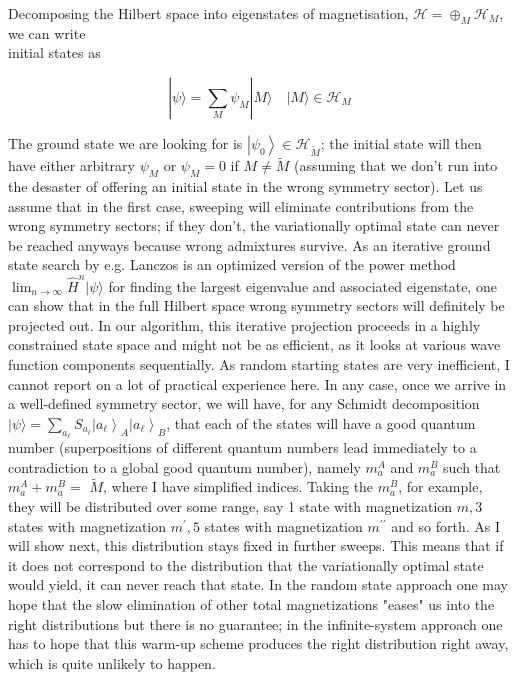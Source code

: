 \documentclass[12pt]{article}
\begin{document}
Decomposing the Hilbert space into eigenstates of magnetisation, $\mathcal{H}=\oplus_{M} \mathcal{H}_{M}$, we can write\\
initial states as


\begin{equation*}
|\psi\rangle=\sum_{M} \psi_{M}|M\rangle \quad|M\rangle \in \mathcal{H}_{M} \tag{212}
\end{equation*}


The ground state we are looking for is $\left|\psi_{0}\right\rangle \in \mathcal{H}_{\tilde{M}}$; the initial state will then have either arbitrary $\psi_{M}$ or $\psi_{M}=0$ if $M \neq \tilde{M}$ (assuming that we don't run into the desaster of offering an initial state in the wrong symmetry sector). Let us assume that in the first case, sweeping will eliminate contributions from the wrong symmetry sectors; if they don't, the variationally optimal state can never be reached anyways because wrong admixtures survive. As an iterative ground state search by e.g. Lanczos is an optimized version of the power method $\lim _{n \rightarrow \infty} \hat{H}^{n}|\psi\rangle$ for finding the largest eigenvalue and associated eigenstate, one can show that in the full Hilbert space wrong symmetry sectors will definitely be projected out. In our algorithm, this iterative projection proceeds in a highly constrained state space and might not be as efficient, as it looks at various wave function components sequentially. As random starting states are very inefficient, I cannot report on a lot of practical experience here. In any case, once we arrive in a well-defined symmetry sector, we will have, for any Schmidt decomposition $|\psi\rangle=\sum_{a_{\ell}} S_{a_{\ell}}\left|a_{\ell}\right\rangle_{A}\left|a_{\ell}\right\rangle_{B}$, that each of the states will have a good quantum number (superpositions of different quantum numbers lead immediately to a contradiction to a global good quantum number), namely $m_{a}^{A}$ and $m_{a}^{B}$ such that $m_{a}^{A}+m_{a}^{B}=$ $\tilde{M}$, where I have simplified indices. Taking the $m_{a}^{B}$, for example, they will be distributed over some range, say 1 state with magnetization $m, 3$ states with magnetization $m^{\prime}, 5$ states with magnetization $m^{\prime \prime}$ and so forth. As I will show next, this distribution stays fixed in further sweeps. This means that if it does not correspond to the distribution that the variationally optimal state would yield, it can never reach that state. In the random state approach one may hope that the slow elimination of other total magnetizations "eases" us into the right distributions but there is no guarantee; in the infinite-system approach one has to hope that this warm-up scheme produces the right distribution right away, which is quite unlikely to happen.
\end{document}
